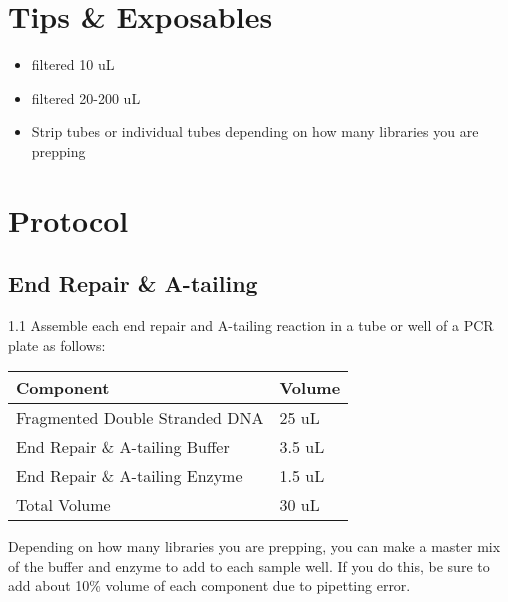 \documentclass[
  letterpaper,
  DIV=11,
  numbers=noendperiod]{scrreprt}
\begin{document}
\hypertarget{tips-exposables}{%
\section*{\texorpdfstring{\textbf{Tips \&
Exposables}}{Tips \& Exposables}}\label{tips-exposables}}


\begin{itemize}
\item
  filtered 10 uL
\item
  filtered 20-200 uL
\item
  Strip tubes or individual tubes depending on how many libraries you
  are prepping
\end{itemize}

\hypertarget{protocol-4}{%
\section*{\texorpdfstring{\textbf{Protocol}}{Protocol}}\label{protocol-4}}


\hypertarget{end-repair-a-tailing}{%
\subsection*{\texorpdfstring{\textbf{End Repair \&
A-tailing}}{End Repair \& A-tailing}}\label{end-repair-a-tailing}}

1.1 Assemble each end repair and A-tailing reaction in a tube or well of
a PCR plate as follows:

\begin{longtable}[]{@{}ll@{}}
\toprule()
\textbf{Component} & \textbf{Volume} \\
\midrule()
\endhead
Fragmented Double Stranded DNA & 25 uL \\
End Repair \& A-tailing Buffer & 3.5 uL \\
End Repair \& A-tailing Enzyme & 1.5 uL \\
Total Volume & 30 uL \\
\bottomrule()
\end{longtable}

Depending on how many libraries you are prepping, you can make a master
mix of the buffer and enzyme to add to each sample well. If you do this,
be sure to add about 10\% volume of each component due to pipetting
error.
\end{document}
